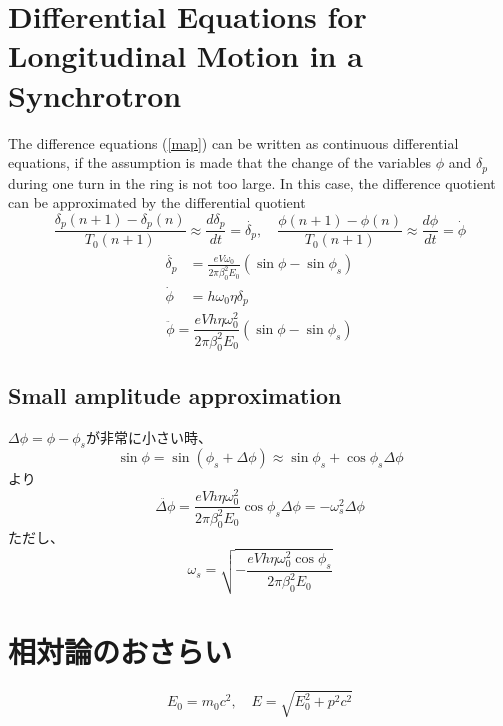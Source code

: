 \documentclass[10pt,a4paper]{ltjsarticle}
\begin{document}
\section{Differential Equations for Longitudinal Motion in a Synchrotron}
The difference equations (\ref{map}) can be written as continuous differential equations, if the assumption is made that the change of the variables $\phi$ and $\delta_p$ during one turn in the ring is not too large. In this case, the difference quotient can be approximated by the differential quotient
%
\begin{equation}
    \frac{\delta_p(n+1)-\delta_p(n)}{T_0(n+1)} \approx \frac{d\delta_p}{dt}=\dot{\delta_p},\quad 
    \frac{\phi(n+1)-\phi(n)}{T_0(n+1)} \approx \frac{d\phi}{dt}= \dot{\phi}
\end{equation}
%
\begin{align}
    \begin{split}
        \dot{\delta_p} &= \frac{e V \omega_0}{2\pi \beta_0^2 E_0}(\sin\phi - \sin\phi_s) \\
        \dot{\phi} &= h \omega_0 \eta \delta_p
    \end{split}
\end{align}
%
\begin{equation}
    \ddot{\phi} = \frac{e V h \eta \omega_0^2}{2\pi\beta_0^2 E_0}(\sin\phi-\sin\phi_s)
\end{equation}
%
\subsection{Small amplitude approximation}
$\Delta\phi = \phi - \phi_s$が非常に小さい時、
%
\begin{equation}
    \sin\phi = \sin(\phi_s+\Delta\phi) \approx \sin\phi_s + \cos\phi_s \Delta\phi
\end{equation}
%
より
%
\begin{equation}
    \ddot{\Delta\phi} = \frac{e V h \eta \omega_0^2}{2\pi \beta_0^2 E_0} \cos\phi_s \Delta\phi = - \omega_s^2 \Delta\phi
\end{equation}
%
ただし、
%
\begin{equation}
    \omega_s = \sqrt{-\frac{e V h \eta \omega_0^2 \cos\phi_s}{2\pi \beta_0^2 E_0}}
\end{equation}
%
\clearpage

\appendix
\renewcommand{\theequation}{\Alph{section}.\arabic{equation} }
\setcounter{equation}{0}

\section{相対論のおさらい}
\begin{equation}
    E_0 = m_0 c^2 ,\quad E = \sqrt{E_0^2 + p^2 c^2}
\end{equation}
\end{document}

